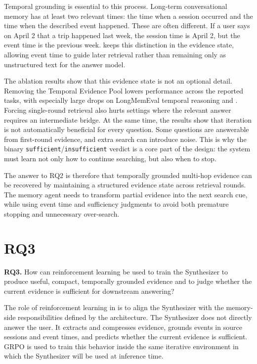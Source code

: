 Temporal grounding is essential to this process. Long-term conversational
memory has at least two relevant times: the time when a session occurred and
the time when the described event happened. These are often different. If a
user says on April 2 that a trip happened last week, the session time is April
2, but the event time is the previous week. \sys{} keeps this distinction in
the evidence state, allowing event time to guide later retrieval rather than
remaining only as unstructured text for the answer model.

The ablation results show that this evidence state is not an optional detail.
Removing the Temporal Evidence Pool lowers performance across the reported
tasks, with especially large drops on LongMemEval temporal reasoning and
\bench{}. Forcing single-round retrieval also hurts settings where the relevant
answer requires an intermediate bridge. At the same time, the results show that
iteration is not automatically beneficial for every question. Some questions
are answerable from first-round evidence, and extra search can introduce noise.
This is why the binary \texttt{sufficient}/\texttt{insufficient} verdict is a
core part of the design: the system must learn not only how to continue
searching, but also when to stop.

The answer to RQ2 is therefore that temporally grounded multi-hop evidence can
be recovered by maintaining a structured evidence state across retrieval rounds.
The memory agent needs to transform partial evidence into the next search cue,
while using event time and sufficiency judgments to avoid both premature
stopping and unnecessary over-search.

\section{RQ3}
\label{sec:conclusion-rq3}

\textbf{RQ3.} How can reinforcement learning be used to train the Synthesizer
to produce useful, compact, temporally grounded evidence and to judge whether
the current evidence is sufficient for downstream answering?

The role of reinforcement learning in \sys{} is to align the Synthesizer with
the memory-side responsibilities defined by the architecture. The Synthesizer
does not directly answer the user. It extracts and compresses evidence,
grounds events in source sessions and event times, and predicts whether the
current evidence is sufficient. GRPO is used to train this behavior inside the
same iterative environment in which the Synthesizer will be used at inference
time.

